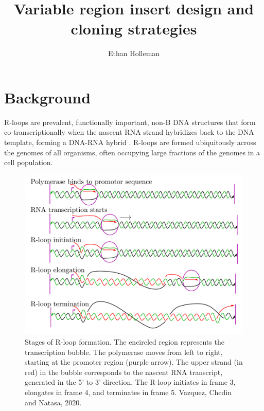 \documentclass[11pt]{article}
\author{Ethan Holleman}
\title{Variable region insert design and cloning strategies}
\begin{document}
\maketitle

\tableofcontents
\pagebreak

\section{Background}

R-loops are prevalent, functionally important, non-B DNA structures that form co-transcriptionally when the nascent RNA strand hybridizes back to the DNA template, forming a DNA-RNA hybrid \cite{chedin_nascent_2016}. R-loops are formed ubiquitously across the genomes of all organisms, often occupying large fractions of the genomes in a cell population. 

\begin{figure}[H]
	\includegraphics[width=12cm]{images/r-loops/rloop_stages.png}
	\centering
	\caption{Stages of R-loop formation. The encircled region represents the transcription bubble. The polymerase moves from left to right, starting at the promoter region (purple arrow). The upper strand (in red) in the bubble corresponds to the nascent RNA transcript, generated in the 5' to 3' direction. The R-loop initiates in frame 3, elongates in frame 4, and terminates in frame 5. Vazquez, Chedin and Natasa, 2020.}
	\label{fig:1}
\end{figure}
\end{document}
